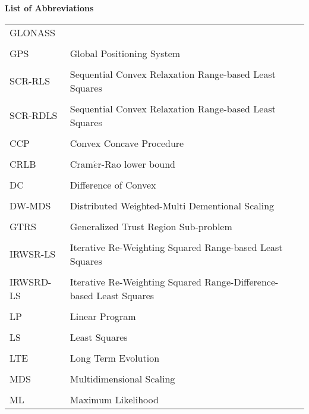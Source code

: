 \newpage


\phantom{m}

\begin{flushleft}
\begin{Huge}
\textbf{List of Abbreviations}
\end{Huge}
\end{flushleft}

\phantom{m}

\begin{longtable}[h]{l l}
GLONASS & \\
\\
GPS & Global Positioning System \\
\\
SCR-RLS & Sequential Convex Relaxation Range-based Least Squares \\
\\
SCR-RDLS & Sequential Convex Relaxation Range-based Least Squares\\
\\
CCP & Convex Concave Procedure \\
\\
CRLB & Cram$\acute{e}$r-Rao  lower  bound \\
\\
DC & Difference of Convex \\
\\
DW-MDS & Distributed Weighted-Multi Dementional Scaling \\
\\
GTRS & Generalized Trust Region Sub-problem \\
\\
IRWSR-LS & Iterative Re-Weighting Squared Range-based Least Squares \\
\\
IRWSRD-LS & Iterative Re-Weighting Squared Range-Difference-based Least Squares\\
\\
LP & Linear Program \\
\\
LS & Least Squares \\
\\
LTE & Long Term Evolution \\
\\
MDS & Multidimensional Scaling \\ 
\\
ML & Maximum Likelihood \\

\end{longtable}
